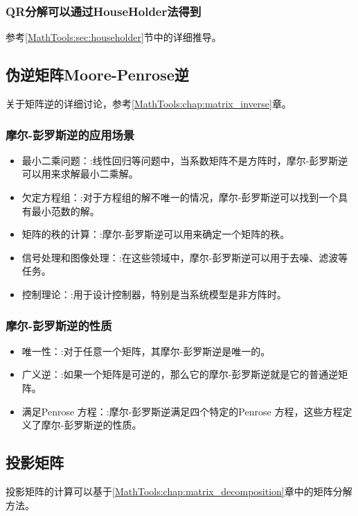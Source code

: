 \subsubsection{QR分解可以通过HouseHolder法得到}
参考\ref{MathTools:sec:householder}节中的详细推导。
\subsection{伪逆矩阵Moore-Penrose逆}
关于矩阵逆的详细讨论，参考\ref{MathTools:chap:matrix_inverse}章。

\subsubsection{摩尔-彭罗斯逆的应用场景}
\begin{itemize}
  \item 最小二乘问题：:线性回归等问题中，当系数矩阵不是方阵时，摩尔-彭罗斯逆可以用来求解最小二乘解。
  \item 欠定方程组：:对于方程组的解不唯一的情况，摩尔-彭罗斯逆可以找到一个具有最小范数的解。
  \item 矩阵的秩的计算：:摩尔-彭罗斯逆可以用来确定一个矩阵的秩。
  \item 信号处理和图像处理：:在这些领域中，摩尔-彭罗斯逆可以用于去噪、滤波等任务。
  \item 控制理论：:用于设计控制器，特别是当系统模型是非方阵时。﻿
\end{itemize}
\subsubsection{摩尔-彭罗斯逆的性质}
\begin{itemize}
  \item 唯一性：:对于任意一个矩阵，其摩尔-彭罗斯逆是唯一的。
  \item 广义逆：:如果一个矩阵是可逆的，那么它的摩尔-彭罗斯逆就是它的普通逆矩阵。
  \item 满足Penrose 方程：:摩尔-彭罗斯逆满足四个特定的Penrose 方程，这些方程定义了摩尔-彭罗斯逆的性质。﻿
\end{itemize}



\subsection{投影矩阵}
投影矩阵的计算可以基于\ref{MathTools:chap:matrix_decomposition}章中的矩阵分解方法。

